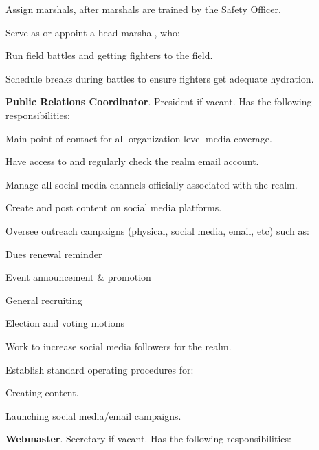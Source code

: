 \documentclass[12pt]{article}
\begin{document}
\begin{level}
\begin{level}
\begin{level}
        \item Assign marshals, after marshals are trained by the Safety Officer.
        \item Serve as or appoint a head marshal, who:
        \begin{level}
            \item Run field battles and getting fighters to the field.
            \item Schedule breaks during battles to ensure fighters get adequate hydration.
        \end{level}
    \end{level}
    \item \textbf{Public Relations Coordinator}. President if vacant. Has the following responsibilities:
    \begin{level}
        \item Main point of contact for all organization-level media coverage.
        \item Have access to and regularly check the realm email account.
        \item Manage all social media channels officially associated with the realm.
        \item Create and post content on social media platforms.
        \item Oversee outreach campaigns (physical, social media, email, etc) such as:
        \begin{level}
            \item Dues renewal reminder
            \item Event announcement \& promotion
            \item General recruiting
            \item Election and voting motions
        \end{level}
        \item Work to increase social media followers for the realm.
        \item Establish standard operating procedures for:
        \begin{level}
            \item Creating content.
            \item Launching social media/email campaigns.
        \end{level}
    \end{level}
    \item \textbf{Webmaster}. Secretary if vacant. Has the following responsibilities:
    \begin{level}

\end{level}
\end{level}
\end{level}
\end{document}
